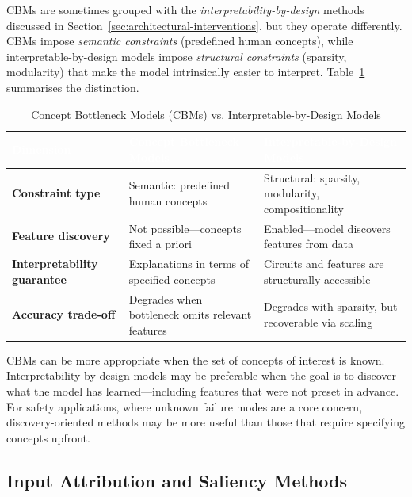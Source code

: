 CBMs are sometimes grouped with the \emph{interpretability-by-design} methods discussed in Section~\ref{sec:architectural-interventions}, but they operate differently. CBMs impose \emph{semantic constraints} (predefined human concepts), while interpretable-by-design models impose \emph{structural constraints} (sparsity, modularity) that make the model intrinsically easier to interpret. Table~\ref{tab:semantic-vs-structural} summarises the distinction.

\begin{table}[tb]
\centering
\caption{Concept Bottleneck Models (CBMs) vs. Interpretable-by-Design Models}
\label{tab:semantic-vs-structural}
\renewcommand{\arraystretch}{1.3}
\begin{tabular}{>{\raggedright\arraybackslash}p{3.5cm} 
                >{\raggedright\arraybackslash}p{5.2cm} 
                >{\raggedright\arraybackslash}p{5.2cm}}
\toprule
\rowcolor{tableheader!80} \textcolor{white}{\textbf{Dimension}} & 
\textcolor{white}{\textbf{Concept Bottleneck Models}} & 
\textcolor{white}{\textbf{Interpretable-by-Design Models}} \\
\midrule
\rowcolor{tablerow1} \textbf{Constraint type} & Semantic: predefined human concepts & Structural: sparsity, modularity, compositionality \\
\rowcolor{tablerow2} \textbf{Feature discovery} & Not possible---concepts fixed a priori & Enabled---model discovers features from data \\
\rowcolor{tablerow1} \textbf{Interpretability guarantee} & Explanations in terms of specified concepts & Circuits and features are structurally accessible \\
\rowcolor{tablerow2} \textbf{Accuracy trade-off} & Degrades when bottleneck omits relevant features & Degrades with sparsity, but recoverable via scaling \\
\bottomrule
\end{tabular}
\end{table}

CBMs can be more appropriate when the set of concepts of interest is known. Interpretability-by-design models may be preferable when the goal is to discover what the model has learned---including features that were not preset in advance. For safety applications, where unknown failure modes are a core concern, discovery-oriented methods may be more useful than those that require specifying concepts upfront. 

\subsection{Input Attribution and Saliency Methods}

